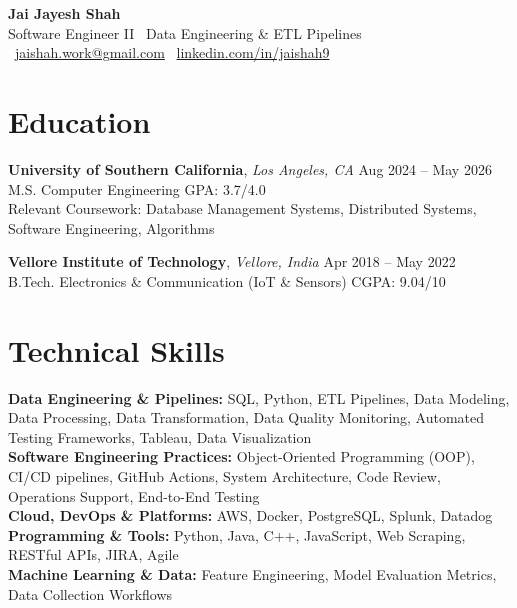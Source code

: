 \documentclass[letterpaper,11pt]{article}
\begin{document}
\begin{center}
    {\LARGE \textbf{Jai Jayesh Shah}}\\
    {\normalsize Software Engineer II \textbar\ Data Engineering \& ETL Pipelines}\\
    \small
    \faEnvelope\ \href{mailto:jaishah.work@gmail.com}{jaishah.work@gmail.com}
    \quad
    \faLinkedin\ \href{https://www.linkedin.com/in/jaishah9}{linkedin.com/in/jaishah9}
\end{center}
\vspace{-13pt}


\section*{Education}
\textbf{University of Southern California}, \textit{Los Angeles, CA} \hfill Aug 2024 -- May 2026 \\
M.S. Computer Engineering \hfill GPA: 3.7/4.0 \\
Relevant Coursework: Database Management Systems, Distributed Systems, Software Engineering, Algorithms

\vspace{4pt}

\textbf{Vellore Institute of Technology}, \textit{Vellore, India }\hfill Apr 2018 -- May 2022 \\
B.Tech. Electronics \& Communication (IoT \& Sensors) \hfill CGPA: 9.04/10


\section*{Technical Skills}
\textbf{Data Engineering \& Pipelines:} SQL, Python, ETL Pipelines, Data Modeling, Data Processing, Data Transformation, Data Quality Monitoring, Automated Testing Frameworks, Tableau, Data Visualization \\
\textbf{Software Engineering Practices:} Object-Oriented Programming (OOP), CI/CD pipelines, GitHub Actions, System Architecture, Code Review, Operations Support, End-to-End Testing \\
\textbf{Cloud, DevOps \& Platforms:} AWS, Docker, PostgreSQL, Splunk, Datadog \\
\textbf{Programming \& Tools:} Python, Java, C++, JavaScript, Web Scraping, RESTful APIs, JIRA, Agile \\
\textbf{Machine Learning \& Data:} Feature Engineering, Model Evaluation Metrics, Data Collection Workflows
\end{document}
